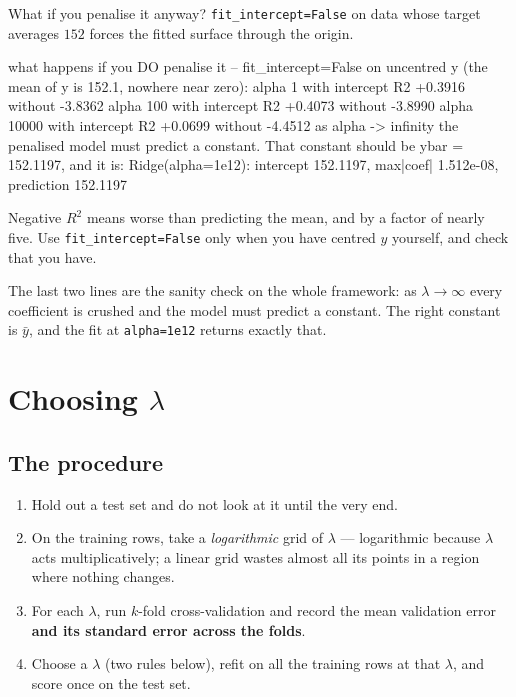 \documentclass[11pt]{article}
\begin{document}
What if you penalise it anyway? \texttt{fit\_intercept=False} on data whose
target averages $152$ forces the fitted surface through the origin.

\begin{codeout}
what happens if you DO penalise it -- fit_intercept=False on
uncentred y (the mean of y is 152.1, nowhere near zero):
   alpha        1   with intercept R2 +0.3916   without -3.8362
   alpha      100   with intercept R2 +0.4073   without -3.8990
   alpha    10000   with intercept R2 +0.0699   without -4.4512
as alpha -> infinity the penalised model must predict a constant.
That constant should be ybar = 152.1197, and it is:
   Ridge(alpha=1e12): intercept 152.1197, max|coef| 1.512e-08, prediction 152.1197
\end{codeout}

\begin{caution}[$R^2 = -3.84$]
Negative $R^2$ means worse than predicting the mean, and by a factor of nearly
five. Use \texttt{fit\_intercept=False} only when you have centred $y$
yourself, and check that you have.
\end{caution}

The last two lines are the sanity check on the whole framework: as
$\lambda \to \infty$ every coefficient is crushed and the model must predict a
constant. The right constant is $\bar y$, and the fit at
\texttt{alpha=1e12} returns exactly that.

\section{Choosing $\lambda$}
\label{sec:cv}

\subsection{The procedure}

\begin{enumerate}[leftmargin=*]
  \item Hold out a test set and do not look at it until the very end.
  \item On the training rows, take a \emph{logarithmic} grid of $\lambda$ ---
    logarithmic because $\lambda$ acts multiplicatively; a linear grid wastes
    almost all its points in a region where nothing changes.
  \item For each $\lambda$, run $k$-fold cross-validation and record the mean
    validation error \textbf{and its standard error across the folds}.
  \item Choose a $\lambda$ (two rules below), refit on all the training rows
    at that $\lambda$, and score once on the test set.
\end{enumerate}
\end{document}

